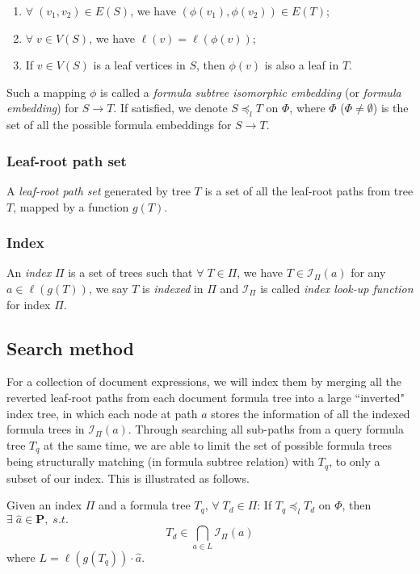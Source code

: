 \begin{enumerate}
\item 
$\forall\; (v_1,v_2) \in E(S)$, we have $(\phi(v_1),\phi(v_2)) \in E(T)$;
\item
$\forall\; v \in V(S)$, we have $\ell(v) = \ell(\phi(v))$;
\item
If $v \in V(S)$ is a leaf vertices in $S$, then $\phi(v)$ is also a leaf in $T$.
\end{enumerate}
Such a mapping $\phi$ is called a \textit{formula subtree isomorphic embedding} (or \textit{formula embedding}) for $S \rightarrow T$. 
If satisfied, we denote $S \preceq_l T$ on $\Phi$, where $\Phi$ ($\Phi \neq \emptyset$) is the set of all the possible formula embeddings for $S \rightarrow T$.

\subsubsection{Leaf-root path set}
A \textit{leaf-root path set} generated by tree $T$ is a set of all the leaf-root paths from tree $T$, mapped by a function $g(T)$. 

\subsubsection{Index}
An \textit{index} $\Pi$ is a set of trees such that $\forall\; T \in \Pi$, we have $T \in \mathcal{I}_{\Pi}(a)$ for any $a \in \ell(g(T))$, we say $T$ is \textit{indexed} in $\Pi$ and $\mathcal{I}_{\Pi}$ is called \textit{index look-up function} for index $\Pi$. 

\subsection{Search method}
\label{se-method}
For a collection of document expressions, we will index them by merging all the reverted leaf-root paths from each document formula tree into a large ``inverted" index tree, 
in which each node at path $a$ stores the information of all the indexed formula trees in $\mathcal{I}_{\Pi}(a)$.
Through searching all sub-paths from a query formula tree $T_q$ at the same time, we are able to limit the set of possible formula trees being structurally matching (in formula subtree relation) with $T_q$, to only a subset of our index. 
This is illustrated as follows.

Given an index $\Pi$ and a formula tree $T_q$, $\forall\; T_d \in \Pi$:
If $T_q \preceq_l T_d$ on $\Phi$, then $\exists\; \hat{a} \in \mathbf{P},\; s.t.$
$$
T_d \in \bigcap_{a \in L} \mathcal{I}_{\Pi}(a)
$$
where $L = \ell(g(T_q)) \cdot \hat{a}$.

